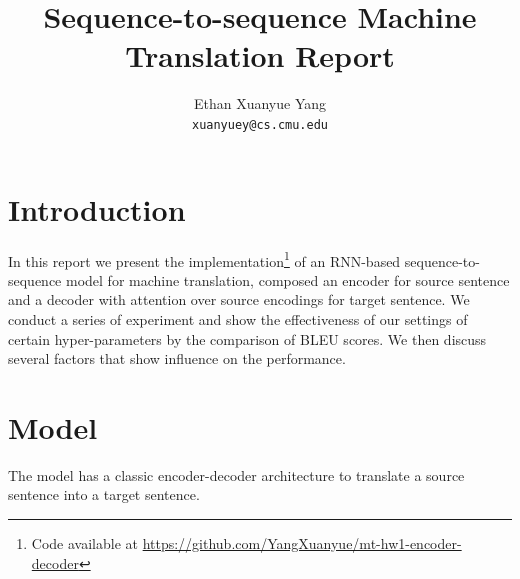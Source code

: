 \documentclass[11pt,a4paper]{article}
\title{Sequence-to-sequence Machine Translation Report}
\author{Ethan Xuanyue Yang \\
  {\tt xuanyuey@cs.cmu.edu}}
\begin{document}
\maketitle

\section{Introduction}

In this report we present the implementation\footnote{Code available at \hyperlink{https://github.com/YangXuanyue/mt-hw1-encoder-decoder}{https://github.com/YangXuanyue/mt-hw1-encoder-decoder}} of an RNN-based sequence-to-sequence model for machine translation, composed an encoder for source sentence and a decoder with attention over source encodings for target sentence. We conduct a series of experiment and show the effectiveness of our settings of certain hyper-parameters by the comparison of BLEU scores. We then discuss several factors that show influence on the performance.

\section{Model}
The model has a classic encoder-decoder architecture to translate a source sentence into a target sentence.
\end{document}
